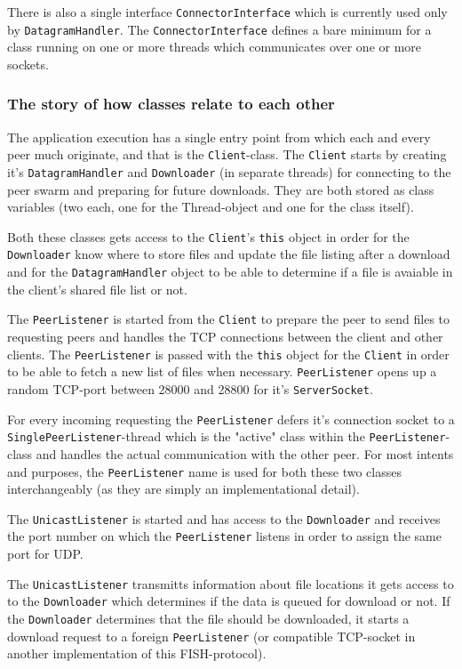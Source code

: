 \documentclass[11pt]{article}
\begin{document}
There is also a single interface \texttt{ConnectorInterface} which is currently
used only by \texttt{DatagramHandler}. The \texttt{ConnectorInterface} defines
a bare minimum for a class running on one or more threads which communicates
over one or more sockets.

\subsubsection{The story of how classes relate to each other}

The application execution has a single entry point from which each and every
peer much originate, and that is the \texttt{Client}-class. The \texttt{Client} starts by creating
it's \texttt{DatagramHandler} and \texttt{Downloader} (in separate threads) for connecting to the
peer swarm and preparing for future downloads. They are both stored as class 
variables (two each, one for the Thread-object and one for the class itself).

Both these classes gets access to the \texttt{Client}'s \texttt{this} object in order
for the \texttt{Downloader} know where to store files and update the file
listing after a download and for the \texttt{DatagramHandler} object to be
able to determine if a file is avaiable in the client's shared file list or not.

The \texttt{PeerListener} is started from the \texttt{Client} to prepare the peer to send files
to requesting peers and handles the TCP connections between the client and other
clients. The \texttt{PeerListener} is passed with the \texttt{this} object for the
\texttt{Client} in order to be able to fetch a new list of files when necessary.
\texttt{PeerListener} opens up a random TCP-port between 28000 and 28800 for it's
\texttt{ServerSocket}.

For every incoming requesting the \texttt{PeerListener} defers it's connection
socket to a \texttt{SinglePeerListener}-thread which is the "active" class
within the \texttt{PeerListener}-class and handles the actual communication
with the other peer. For most intents and purposes, the \texttt{PeerListener}
name is used for both these two classes interchangeably (as they are simply an
implementational detail).

The \texttt{UnicastListener} is started and has access to the \texttt{Downloader}
and receives the port number on which the \texttt{PeerListener} listens in order
to assign the same port for UDP.

The \texttt{UnicastListener} transmitts information about file locations it gets
access to to the \texttt{Downloader} which determines if the data is queued for download
or not. If the \texttt{Downloader} determines that the file
should be downloaded, it starts a download request to a foreign
\texttt{PeerListener} (or compatible TCP-socket in another implementation of this
FISH-protocol).
\end{document}
